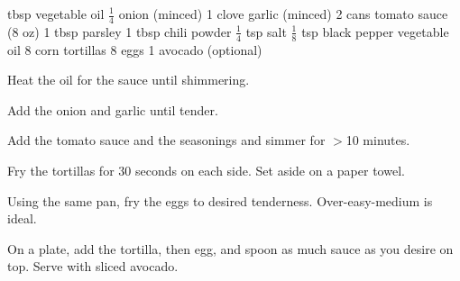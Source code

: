\dishtype{\breakfast}
\dishother{\vegetarian}
\begin{ingreds}
     tbsp vegetable oil
        $\frac{1}{4}$ onion (minced)
        1 clove garlic (minced)
        2 cans tomato sauce (8 oz)
        1 tbsp parsley
        1 tbsp chili powder
        $\frac{1}{4}$ tsp salt
        $\frac{1}{8}$ tsp black pepper
    \columnbreak{}
    vegetable oil
    8 corn tortillas
    8 eggs
    1 avocado (optional)
\end{ingreds}
\begin{method}
    Heat the oil for the sauce until shimmering.\par
    Add the onion and garlic until tender.\par
    Add the tomato sauce and the seasonings and simmer for $>$10 minutes.\par
    Fry the tortillas for 30 seconds on each side. Set aside on a paper towel.\par
    Using the same pan, fry the eggs to desired tenderness. Over-easy-medium is ideal.\par
    On a plate, add the tortilla, then egg, and spoon as much sauce as you desire on top. Serve with sliced avocado.
\end{method}